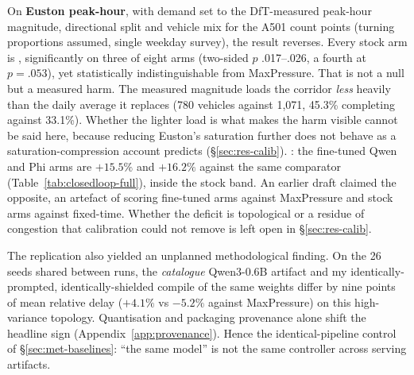 On \textbf{Euston peak-hour}, with demand set to the DfT-measured
peak-hour magnitude, directional split and vehicle mix for the A501 count
points (turning proportions assumed, single weekday survey), the result
reverses. Every stock arm is , significantly on three of eight arms (two-sided $p$
.017--.026, a fourth at $p{=}.053$), yet statistically indistinguishable
from MaxPressure. That is not a null but a measured harm. The measured
magnitude loads the corridor \emph{less} heavily than the daily average it
replaces (780 vehicles against 1{,}071, 45.3\% completing against 33.1\%).
Whether the lighter load is what makes the harm visible cannot be said
here, because reducing Euston's saturation further does not behave as a
saturation-compression account predicts (\S\ref{sec:res-calib}).
: the fine-tuned Qwen and Phi arms
are $+15.5\%$ and $+16.2\%$ against the same comparator
(Table~\ref{tab:closedloop-full}), inside the stock band. An earlier draft
claimed the opposite, an artefact of scoring fine-tuned arms against
MaxPressure and stock arms against fixed-time. Whether the deficit is
topological or a residue of congestion that calibration could not remove
is left open in \S\ref{sec:res-calib}.

The replication also yielded an unplanned methodological finding. On the
26 seeds shared between runs, the \emph{catalogue} Qwen3-0.6B artifact and
my identically-prompted, identically-shielded compile of the same weights
differ by nine points of mean relative delay ($+4.1\%$ vs $-5.2\%$ against
MaxPressure) on this high-variance topology. Quantisation and packaging
provenance alone shift the headline sign (Appendix~\ref{app:provenance}).
Hence the identical-pipeline control of \S\ref{sec:met-baselines}: ``the
same model'' is not the same controller across serving artifacts.
